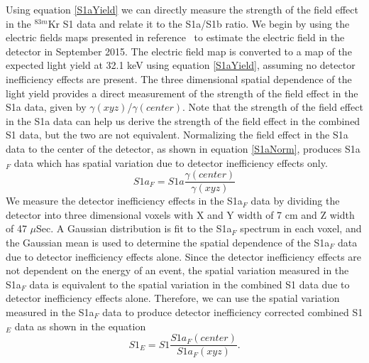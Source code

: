 \documentclass[a4paper,10pt,twocolumn]{article}
\begin{document}
Using equation \ref{S1aYield} we can directly measure the strength of the field effect in the $^{83m}$Kr S1 data and relate it to the S1a/S1b ratio.  We begin by using the electric fields maps presented in reference~\cite{LuciesMaps} to estimate the electric field in the detector in September 2015.   The electric field map is converted to a map of the expected light yield at 32.1 keV using equation \ref{S1aYield}, assuming no detector inefficiency effects are present. The three dimensional spatial dependence of the light yield provides a direct measurement of the strength of the field effect in the S1a data, given by $\gamma(xyz)$/$\gamma(center)$.  Note that the strength of the field effect in the S1a data can help us derive the strength of the field effect in the combined S1 data, but the two are not equivalent.  Normalizing the field effect in the S1a data to the center of the detector, as shown in equation \ref{S1aNorm}, produces S1a$_F$ data which has spatial variation due to detector inefficiency effects only.  
\begin{equation}
S1a_F = S1a \frac{\gamma(center)}{\gamma(xyz)}
\label{S1aNorm}
\end{equation}
We measure the detector inefficiency effects in the S1a$_F$ data by dividing the detector into three dimensional voxels with X and Y width of 7 cm and Z width of 47 $\mu$Sec.  A Gaussian distribution is fit to the S1a$_F$ spectrum in each voxel, and the Gaussian mean is used to determine the spatial dependence of the S1a$_F$ data due to detector inefficiency effects alone.  Since the detector inefficiency effects are not dependent on the energy of an event, the spatial variation measured in the S1a$_F$ data is equivalent to the spatial variation in the combined S1 data due to detector inefficiency effects alone.  Therefore, we can use the spatial variation measured in the S1a$_F$ data to produce detector inefficiency corrected combined S1$_E$ data as shown in the equation
\begin{equation}
S1_E= S1 \frac{S1a_F(center)}{S1a_F(xyz)}.
\end{equation}
\end{document}
